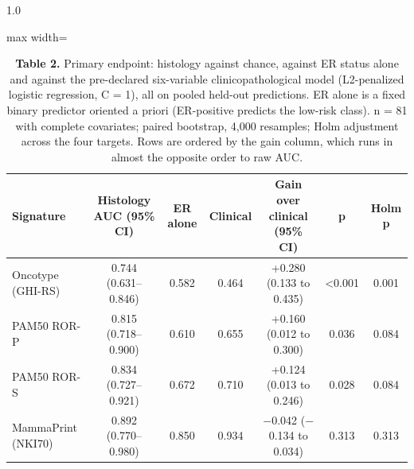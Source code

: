 \documentclass[11pt,a4paper]{article}
\begin{document}
\begin{spacing}{1.0}
\begin{table}[htbp]\centering\footnotesize
\caption*{\textbf{Table 2.} Primary endpoint: histology against chance, against ER status alone and against the pre-declared six-variable clinicopathological model (L2-penalized logistic regression, C = 1), all on pooled held-out predictions. ER alone is a fixed binary predictor oriented a priori (ER-positive predicts the low-risk class). n = 81 with complete covariates; paired bootstrap, 4,000 resamples; Holm adjustment across the four targets. Rows are ordered by the gain column, which runs in almost the opposite order to raw AUC.}
\begin{adjustbox}{max width=\textwidth}
\begin{tabular}{@{}lcccccc@{}}
\toprule
\textbf{Signature} & \textbf{Histology AUC (95\% CI)} & \textbf{ER alone} & \textbf{Clinical} & \textbf{Gain over clinical (95\% CI)} & \textbf{p} & \textbf{Holm p} \\
\midrule
Oncotype (GHI-RS) & 0.744 (0.631--0.846) & 0.582 & 0.464 & +0.280 (0.133 to 0.435) & <0.001 & 0.001 \\
PAM50 ROR-P & 0.815 (0.718--0.900) & 0.610 & 0.655 & +0.160 (0.012 to 0.300) & 0.036 & 0.084 \\
PAM50 ROR-S & 0.834 (0.727--0.921) & 0.672 & 0.710 & +0.124 (0.013 to 0.246) & 0.028 & 0.084 \\
MammaPrint (NKI70) & 0.892 (0.770--0.980) & 0.850 & 0.934 & $-$0.042 ($-$0.134 to 0.034) & 0.313 & 0.313 \\
\bottomrule
\end{tabular}
\end{adjustbox}\end{table}


\end{spacing}
\end{document}
